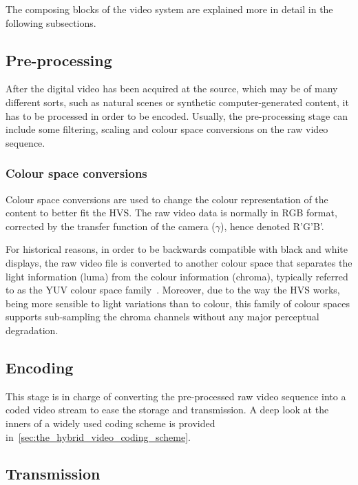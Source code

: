 \documentclass[11pt,a4paper,openright,twoside]{book}
\numberwithin{equation}{section} %
\begin{document}
The composing blocks of the video system are explained more in detail in
the following subsections.

\subsection{Pre-processing}
\label{sub:pre_processing}

After the digital video has been acquired at the source, which may be of
many different sorts, such as natural scenes or synthetic
computer-generated content, it has to be processed in order to be
encoded.
Usually, the pre-processing stage can include some filtering, scaling
and colour space conversions on the raw video sequence.

\subsubsection{Colour space conversions}
\label{ssub:colour_space_conversions}

Colour space conversions are used to change the colour
representation of the content to better fit the \ac{HVS}.
The raw video data is normally in \ac{RGB} format, corrected by the
transfer function of the camera ($\gamma$), hence denoted R'G'B'.

For historical reasons, in order to be backwards compatible with black
and white displays, the raw video file is converted to another colour
space that separates the light information (luma) from the colour
information (chroma), typically referred to as the YUV colour space
family~\cite{poynton-95-color-space}.
Moreover, due to the way the \ac{HVS} works, being more sensible to
light variations than to colour, this family of colour spaces supports
sub-sampling the chroma channels without any major perceptual
degradation.

\subsection{Encoding}
\label{sub:encoding}

This stage is in charge of converting the pre-processed raw video sequence
into a coded video stream to ease the storage and transmission.
A deep look at the inners of a widely used coding scheme is provided
in~\ref{sec:the_hybrid_video_coding_scheme}.

\subsection{Transmission}
\label{sub:transmission}
\end{document}
